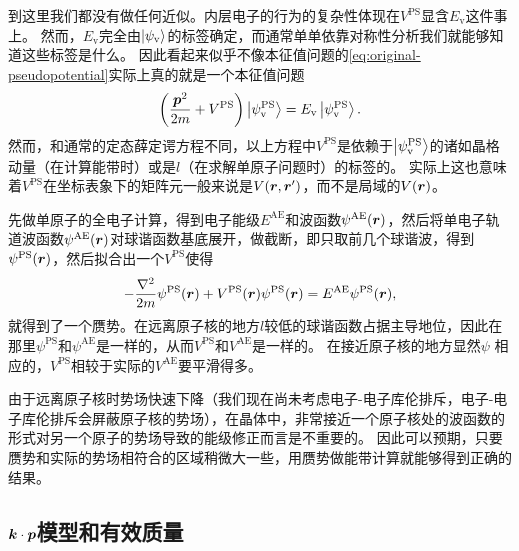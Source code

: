 到这里我们都没有做任何近似。内层电子的行为的复杂性体现在$V^\text{PS}$显含$E_\text{v}$这件事上。
然而，$E_\text{v}$完全由$\ket{\psi_\text{v}}$的标签确定，而通常单单依靠对称性分析我们就能够知道这些标签是什么。
因此看起来似乎不像本征值问题的\eqref{eq:original-pseudopotential}实际上真的就是一个本征值问题
\begin{equation}
    \left( \frac{\vb*{p}^2}{2m} + V^\text{PS} \right) \ket{\psi_\text{v}^\text{PS}} = E_\text{v} \ket{\psi_\text{v}^\text{PS}}.
\end{equation}
然而，和通常的定态薛定谔方程不同，以上方程中$V^\text{PS}$是依赖于$\ket{\psi_\text{v}^\text{PS}}$的诸如晶格动量（在计算能带时）或是$l$（在求解单原子问题时）的标签的。
实际上这也意味着$V^\text{PS}$在坐标表象下的矩阵元一般来说是$V(\vb*{r}, \vb*{r}')$，而不是局域的$V(\vb*{r})$。

先做单原子的全电子计算，得到电子能级$E^\text{AE}$和波函数$\psi^\text{AE}(\vb*{r})$，然后将单电子轨道波函数$\psi^\text{AE}(\vb*{r})$对球谐函数基底展开，做截断，即只取前几个球谐波，得到$\psi^\text{PS}(\vb*{r})$，然后拟合出一个$V^\text{PS}$使得
\begin{equation}
    - \frac{\laplacian}{2m} \psi^\text{PS}(\vb*{r}) + V^\text{PS}(\vb*{r}) \psi^\text{PS}(\vb*{r}) = E^\text{AE} \psi^\text{PS}(\vb*{r}),
\end{equation}
就得到了一个赝势。在远离原子核的地方$l$较低的球谐函数占据主导地位，因此在那里$\psi^\text{PS}$和$\psi^\text{AE}$是一样的，从而$V^\text{PS}$和$V^\text{AE}$是一样的。
在接近原子核的地方显然$\psi$
相应的，$V^\text{PS}$相较于实际的$V^\text{AE}$要平滑得多。

由于远离原子核时势场快速下降（我们现在尚未考虑电子-电子库伦排斥，电子-电子库伦排斥会屏蔽原子核的势场），在晶体中，非常接近一个原子核处的波函数的形式对另一个原子的势场导致的能级修正而言是不重要的。
因此可以预期，只要赝势和实际的势场相符合的区域稍微大一些，用赝势做能带计算就能够得到正确的结果。

\subsection{$\vb*{k} \cdot \vb*{p}$模型和有效质量}

